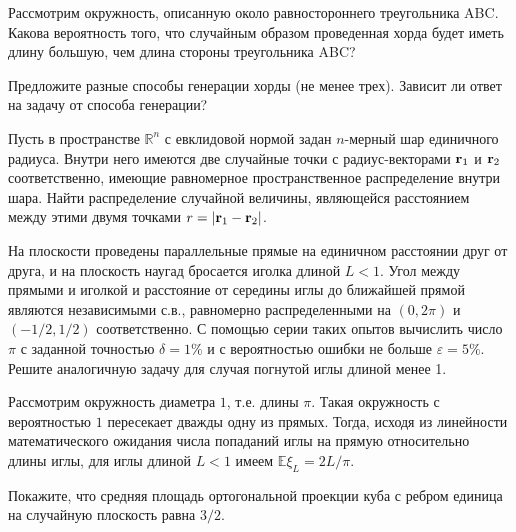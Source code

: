 \begin{problem}
Рассмотрим окружность, описанную около равностороннего треугольника ABC. Какова вероятность того, что случайным образом проведенная хорда будет иметь длину большую, чем длина стороны треугольника ABC? 
\end{problem}

\begin{ordre}
Предложите разные способы генерации хорды (не менее трех). Зависит ли ответ на задачу от способа генерации?
\end{ordre}

\begin{problem}
Пусть в пространстве $\mathbb R^n$ с евклидовой нормой задан $n$-мерный шар единичного радиуса. Внутри него имеются две случайные точки с радиус-векторами ${\bf{r}}_1$ и ${\bf{r}}_2$ соответственно, имеющие равномерное пространственное распределение внутри шара. Найти распределение случайной величины, являющейся расстоянием между этими двумя точками $r = \left|{\bf r}_1 - {\bf r}_2\right|$.
\end{problem}




\begin{problem}
На плоскости проведены параллельные прямые на единичном расстоянии друг от друга, и на плоскость наугад бросается иголка длиной $L<1$. 
Угол между прямыми и иголкой и расстояние от середины иглы до ближайшей прямой являются независимыми с.в., равномерно распределенными 
на $(0,2\pi)$ и $(-1/2,1/2)$ соответственно. С помощью серии таких опытов вычислить число $\pi$ с заданной точностью 
$\delta=1\%$ и с вероятностью ошибки не больше $\varepsilon=5\%$. Решите аналогичную задачу для случая погнутой иглы длиной менее 1.
\end{problem}

\begin{ordre}

Рассмотрим окружность диаметра $1$, т.е. длины $\pi$. Такая окружность с вероятностью $1$ пересекает дважды одну из прямых. 
Тогда, исходя из линейности математического ожидания числа попаданий иглы на прямую относительно длины иглы, для иглы длиной $L<1$ 
имеем ${\mathbb E}\xi_L = 2L/\pi$. 

\end{ordre}



\begin{problem}
Покажите, что средняя площадь ортогональной проекции куба с ребром единица на случайную плоскость равна $3/2$. 
\end{problem}

